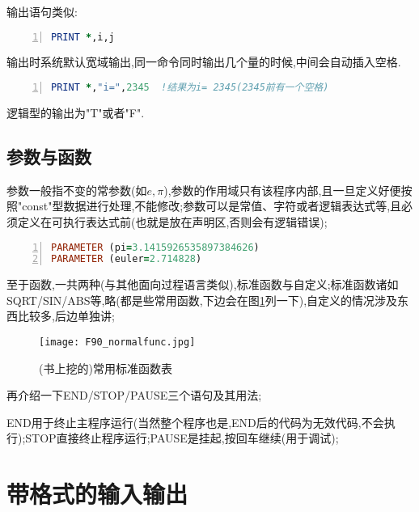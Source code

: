 输出语句类似:

\begin{lstlisting}[numbers=left,frame=single,language=Fortran]
PRINT *,i,j
\end{lstlisting}
\par
输出时系统默认宽域输出,同一命令同时输出几个量的时候,中间会自动插入空格.

\begin{lstlisting}[numbers=left,frame=single,language=Fortran]
PRINT *,"i=",2345  !结果为i= 2345(2345前有一个空格)
\end{lstlisting}
\par

逻辑型的输出为"T"或者"F".

\subsection{参数与函数}
参数一般指不变的常参数(如$e,\pi$),参数的作用域只有该程序内部,且一旦定义好便按照"const"型数据进行处理,不能修改;参数可以是常值、字符或者逻辑表达式等,且必须定义在可执行表达式前(也就是放在声明区,否则会有逻辑错误);

\begin{lstlisting}[numbers=left,frame=single,language=Fortran]
PARAMETER (pi=3.1415926535897384626)
PARAMETER (euler=2.714828)
\end{lstlisting}
\par

至于函数,一共两种(与其他面向过程语言类似),标准函数与自定义;标准函数诸如SQRT/SIN/ABS等,略(都是些常用函数,下边会在图\ref{F90-normalfunc}列一下),自定义的情况涉及东西比较多,后边单独讲;

\begin{figure}[h]
	\noindent
	\centering
	\texttt{[image: F90\_normalfunc.jpg]}
	\caption{(书上挖的)常用标准函数表}
	\label{F90-normalfunc}
\end{figure}

再介绍一下END/STOP/PAUSE三个语句及其用法;\par
END用于终止主程序运行(当然整个程序也是,END后的代码为无效代码,不会执行);STOP直接终止程序运行;PAUSE是挂起,按回车继续(用于调试);

\section{带格式的输入输出}

